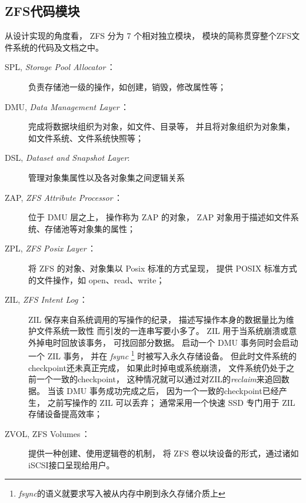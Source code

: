 \subsection{ZFS代码模块}
从设计实现的角度看，
ZFS 分为 7 个相对独立模块，
模块的简称贯穿整个ZFS文件系统的代码及文档之中。

\begin{description}
  \item[SPL, {\em Storage Pool Allocator}\,：]
    负责存储池一级的操作，如创建，销毁，修改属性等；
  \item[DMU, {\em Data Management Layer}\,：]
    完成将数据块组织为对象，如文件、目录等，
    并且将对象组织为对象集，如文件系统、文件系统快照等；
  \item[DSL, {\em Dataset and Snapshot Layer}:]
    管理对象集属性以及各对象集之间逻辑关系
  \item[ZAP, {\em ZFS Attribute Processor}\,：]
    位于 DMU 层之上，
    操作称为 ZAP 的对象，
    ZAP 对象用于描述如文件系统、存储池等对象集的属性；
  \item[ZPL, {\em ZFS Posix Layer}\,：]
    将 ZFS 的对象、对象集以 Posix 标准的方式呈现，
    提供 POSIX 标准方式的文件操作，如 open、read、write；
  \item[ZIL, {\em ZFS Intent Log}\,：]
    ZIL 保存来自系统调用的写操作的纪录，
    描述写操作本身的数据量比为维护文件系统一致性%
    而引发的一连串写要小多了。
    ZIL 用于当系统崩溃或意外掉电时回放该事务，
    可找回部分数据。
    启动一个 DMU 事务同时会启动一个 ZIL 事务，
    并在 {\em fsync}%
    \footnote{{\em fsync}的语义就要求写入被从内存中刷到永久存储介质上}
    时被写入永久存储设备。
    但此时文件系统的checkpoint还未真正完成，
    如果此时掉电或系统崩溃，
    文件系统仍处于之前一个一致的checkpoint，
    这种情况就可以通过对ZIL的{\em reclaim}来追回数据。
    当该 DMU 事务成功完成之后，
    因为一个一致的checkpoint已经产生，
    之前写操作的 ZIL 可以丢弃；
    通常采用一个快速 SSD 专门用于 ZIL 存储设备提高效率；
  \item[ZVOL, {ZFS Volumes}\,：]
    提供一种创建、使用逻辑卷的机制，
    将 ZFS 卷以块设备的形式，通过诸如iSCSI接口呈现给用户。    
\end{description}

